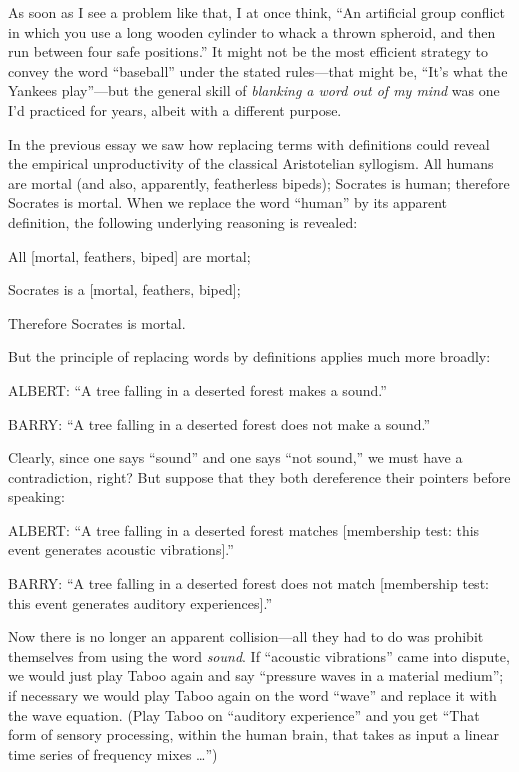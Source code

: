 {
 As soon as I see a problem like that, I at once think,
``An artificial group conflict in which you use a long
wooden cylinder to whack a thrown spheroid, and then run between four
safe positions.'' It might not be the most efficient
strategy to convey the word
``baseball'' under the stated
rules---that might be, ``It's what the
Yankees play''---but the general skill of
\textit{blanking a word out of my mind} was one I'd
practiced for years, albeit with a different purpose.}

{
 In the previous essay we saw how replacing terms with definitions
could reveal the empirical unproductivity of the classical Aristotelian
syllogism. All humans are mortal (and also, apparently, featherless
bipeds); Socrates is human; therefore Socrates is mortal. When we
replace the word ``human'' by its
apparent definition, the following underlying reasoning is revealed:}

{
 All [mortal, {\textlnot}feathers, biped] are mortal;}

{
 Socrates is a [mortal, {\textlnot}feathers, biped];}

{
 Therefore Socrates is mortal.}

{
 But the principle of replacing words by definitions applies much
more broadly:}

{
 ALBERT: ``A tree falling in a deserted forest
makes a sound.''}

{
 BARRY: ``A tree falling in a deserted forest does
not make a sound.''}

{
 Clearly, since one says
``sound'' and one says
``not sound,'' we must have a
contradiction, right? But suppose that they both dereference their
pointers before speaking:}

{
 ALBERT: ``A tree falling in a deserted forest
matches [membership test: this event generates acoustic
vibrations].''}

{
 BARRY: ``A tree falling in a deserted forest does
not match [membership test: this event generates auditory
experiences].''}

{
 Now there is no longer an apparent collision---all they had to do
was prohibit themselves from using the word \textit{sound}. If
``acoustic vibrations'' came into
dispute, we would just play Taboo again and say
``pressure waves in a material
medium''; if necessary we would play Taboo again on
the word ``wave'' and replace it
with the wave equation. (Play Taboo on ``auditory
experience'' and you get ``That form
of sensory processing, within the human brain, that takes as input a
linear time series of frequency mixes \ldots'')}

